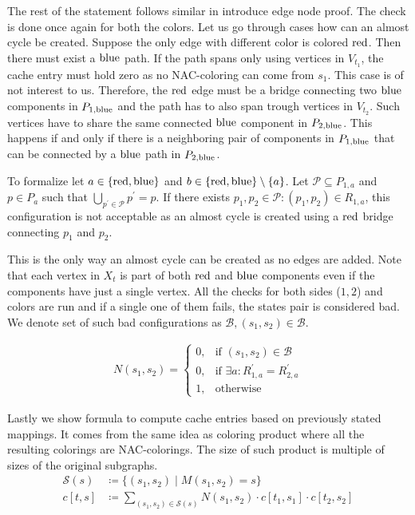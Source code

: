 The rest of the statement follows similar in introduce edge node proof.
The check is done once again for both the colors.
Let us go through cases how can an almost cycle be created.
Suppose the only edge with different color is colored \( \text{red} \).
Then there must exist a \( \text{blue} \) path. If the path spans only using vertices
in \( V_{t_1} \), the cache entry must hold zero as no NAC-coloring can come
from \( s_1 \). This case is of not interest to us.
Therefore, the \( \text{red} \) edge must be
a bridge connecting two \( \text{blue} \) components in \( P_{1,\text{blue}} \) and
the path has to also span trough vertices in \( V_{t_2} \).
Such vertices have to share the same connected \( \text{blue} \) component in \( P_{2,\text{blue}} \).
This happens if and only if there is a neighboring pair of components in \( P_{1,\text{blue}} \)
that can be connected by a \( \text{blue} \) path in \( P_{2,\text{blue}} \).

To formalize let \( a \in \{\text{red}, \text{blue} \}  \) and \( b \in \{\text{red}, \text{blue} \} \setminus \{a\} \).
Let \( \mathcal{P} \subseteq P_{1, a} \)
and \( p \in P_{a} \) such that \( \bigcup_{p^\prime \in \mathcal{P}} p^\prime = p \).
If there exists \( p_1, p_2 \in \mathcal{P} : (p_1, p_2) \in R_{1, a} \),
this configuration is not acceptable as an almost cycle is created
using a \( \text{red} \) bridge connecting \( p_1 \) and \( p_2 \).

This is the only way an almost cycle can be created as no edges are added.
Note that each vertex in \( X_t \) is part of both \( \text{red} \) and \( \text{blue} \)
components even if the components have just a single vertex.
All the checks for both sides (\( 1, 2 \)) and colors are run and
if a single one of them fails, the states pair is considered bad.
We denote set of such bad configurations as \( \mathcal{B}, (s_1, s_2) \in \mathcal{B} \).

%
\begin{align*}
	N(s_1, s_2) =
	\begin{cases}
		0, & \text{if } (s_1, s_2) \in \mathcal{B}                  \\
		0, & \text{if } \exists a : R_{1,a}^\prime = R_{2,a}^\prime \\
		1, & \text{otherwise}
	\end{cases}
\end{align*}
%

Lastly we show formula to compute cache entries based on previously stated mappings.
It comes from the same idea as coloring product where all the resulting colorings
are NAC-colorings. The size of such product is multiple of sizes of the original subgraphs.
%
\begin{align*}
	\mathcal{S}(s) & \coloneqq \{(s_1, s_2) \mid M(s_1, s_2) = s \}                                                     \\
	c[t, s]        & \coloneqq \sum_{(s_1, s_2) \in \mathcal{S}(s)} N(s_1, s_2) \cdot c[t_1, s_1] \cdot c[t_{2}, s_{2}]
\end{align*}
%

